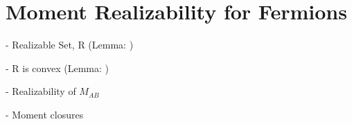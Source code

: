 \section{Moment Realizability for Fermions}
\label{sec:realizability}

  - Realizable Set, R (Lemma: )

  - R is convex (Lemma: )

  - Realizability of $M_{AB}$

  - Moment closures